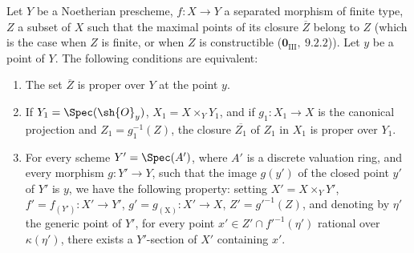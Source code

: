 \begin{corollary}[15.7.4]
\label{IV.15.7.4}
Let $Y$ be a Noetherian prescheme, $f:X\to Y$ a separated morphism of finite type, $Z$ a subset of $X$ such that the maximal points of its closure $\overline{Z}$ belong to $Z$ (which is the case when $Z$ is finite, or when $Z$ is constructible ($\mathbf{0}_{\mathrm{III}},~9.2.2$)).
Let $y$ be a point of $Y$.
The following conditions are equivalent:
\begin{enumerate}[label=\emph{\alph*)}]
  \item The set $\overline{Z}$ is proper over $Y$ at the point $y$.
  \item If $Y_1=\Spec(\sh{O}_y)$, $X_1=X\times_Y Y_1$, and if $g_1:X_1\to X$ is the canonical projection and $Z_1=g_1^{-1}(Z)$, the closure $\overline{Z_1}$ of $Z_1$ in $X_1$ is proper over $Y_1$.
  \item For every scheme $Y'=\Spec(A')$, where $A'$ is a discrete valuation ring, and every morphism $g:Y'\to Y$, such that the image $g(y')$ of the closed point $y'$ of $Y'$ is $y$, we have the following property: setting $X'=X\times_Y Y'$, $f'=f_{(Y')}:X'\to Y'$, $g'=g_{(\mathrm{X})}:X'\to X$, $Z'=g'^{-1}(Z)$, and denoting by $\eta'$
the generic point of $Y'$, for every point $x'\in Z'\cap f'^{-1}(\eta')$ rational over $\kappa(\eta')$, there exists a $Y'$-section of $X'$ containing $x'$.
\end{enumerate}
\end{corollary}

